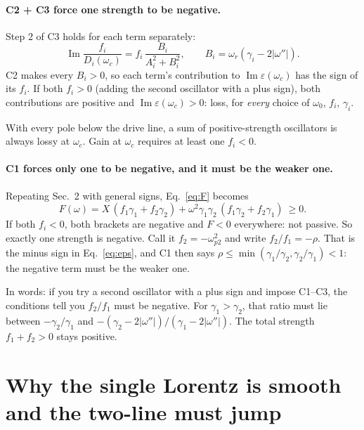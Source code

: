 \documentclass[11pt]{article}
\newcommand{\wi}{|\omega''|}          %
\newcommand{\wpb}{\omega_{p2}}
\renewcommand{\Im}{\operatorname{Im}}
\begin{document}
\paragraph{C2 + C3 force one strength to be negative.}
Step 2 of C3 holds for each term separately:
\begin{equation}
  \Im\frac{f_i}{D_i(\omega_c)} = f_i\,\frac{B_i}{A_i^2+B_i^2},\qquad B_i=\omega_r(\gamma_i-2\wi).
\end{equation}
C2 makes every $B_i>0$, so each term's contribution to $\Im\varepsilon(\omega_c)$ has the sign of its $f_i$.
If both $f_i>0$ (adding the second oscillator with a plus sign), both contributions are positive and $\Im\varepsilon(\omega_c)>0$: loss, for \emph{every} choice of $\omega_0$, $f_i$, $\gamma_i$.
\begin{result}
With every pole below the drive line, a sum of positive-strength oscillators is always lossy at $\omega_c$. Gain at $\omega_c$ requires at least one $f_i<0$.
\end{result}

\paragraph{C1 forces only one to be negative, and it must be the weaker one.}
Repeating Sec.~2 with general signs, Eq.~\eqref{eq:F} becomes
\begin{equation}
  F(\omega) = X\,(f_1\gamma_1+f_2\gamma_2) + \omega^2\gamma_1\gamma_2\,(f_1\gamma_2+f_2\gamma_1)\ \ge 0 .
\end{equation}
If both $f_i<0$, both brackets are negative and $F<0$ everywhere: not passive.
So exactly one strength is negative. Call it $f_2=-\wpb^2$ and write $f_2/f_1=-\rho$.
That is the minus sign in Eq.~\eqref{eq:eps}, and C1 then says $\rho\le\min(\gamma_1/\gamma_2,\gamma_2/\gamma_1)<1$: the negative term must be the weaker one.

\medskip
\noindent In words: if you try a second oscillator with a plus sign and impose C1--C3, the conditions tell you $f_2/f_1$ must be negative.
For $\gamma_1>\gamma_2$, that ratio must lie between $-\gamma_2/\gamma_1$ and $-(\gamma_2-2\wi)/(\gamma_1-2\wi)$.
The total strength $f_1+f_2>0$ stays positive.

\section{Why the single Lorentz is smooth and the two-line must jump}\label{app:jumps}
\end{document}
